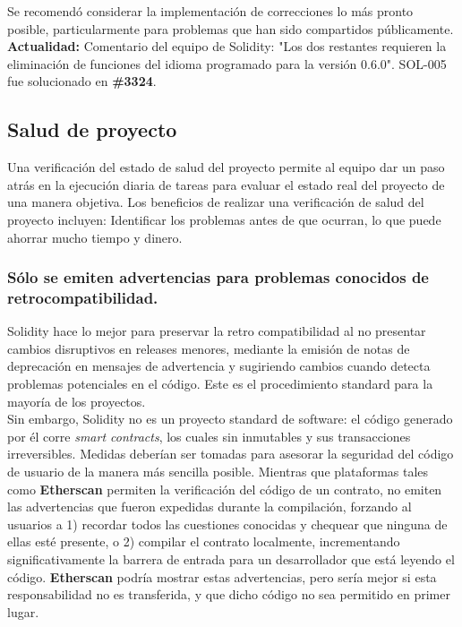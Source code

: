Se recomendó considerar la implementación de correcciones lo más pronto posible, particularmente para problemas que han sido compartidos públicamente.\\

\textbf{Actualidad:} Comentario del equipo de Solidity: "Los dos restantes requieren la eliminación de funciones del idioma programado para la versión 0.6.0". SOL-005 fue solucionado en \textbf{\#3324}.

\subsection{Salud de proyecto}
Una verificación del estado de salud del proyecto permite al equipo dar un paso atrás en la ejecución diaria de tareas para evaluar el estado real del proyecto de una manera objetiva. Los beneficios de realizar una verificación de salud del proyecto incluyen: Identificar los problemas antes de que ocurran, lo que puede ahorrar mucho tiempo y dinero.


\subsubsection{Sólo se emiten advertencias para problemas conocidos de retrocompatibilidad.}
Solidity hace lo mejor para preservar la retro compatibilidad al no presentar cambios disruptivos en releases menores, mediante la emisión de notas de deprecación en mensajes de advertencia y sugiriendo cambios cuando detecta problemas potenciales en el código. Este es el procedimiento standard para la mayoría de los proyectos.\\

Sin embargo, Solidity no es un proyecto standard de software: el código generado por él corre \textit{smart contracts}, los cuales sin inmutables y sus transacciones irreversibles. Medidas deberían ser tomadas para asesorar la seguridad del código de usuario de la manera más sencilla posible. Mientras que plataformas tales como \textbf{Etherscan} permiten la verificación del código de un contrato, no emiten las advertencias que fueron expedidas durante la compilación, forzando al usuarios a 1) recordar todos las cuestiones conocidas y chequear que ninguna de ellas esté presente, o 2) compilar el contrato localmente, incrementando significativamente la barrera de entrada para un desarrollador que está leyendo el código. \textbf{Etherscan} podría mostrar estas advertencias, pero sería mejor si esta responsabilidad no es transferida, y que dicho código no sea permitido en primer lugar.\\

